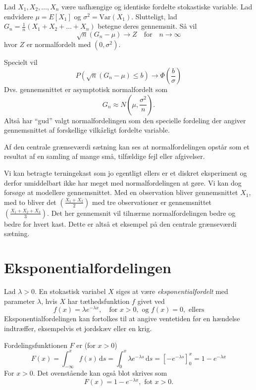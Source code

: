 \begin{sæt} 
  Lad $X_1, X_2, \ldots, X_n$ være uafhængige og identiske fordelte stokastiske variable. Lad endvidere $\mu = E[X_1]$ og $\sigma^2 = \mathrm{Var}(X_1)$. Slutteligt, lad $G_n = \frac{1}{n}(X_1 + X_2 + \ldots + X_n)$ betegne deres gennemsnit. Så vil
  \[ 
  \sqrt{n}(G_n - \mu) \to Z \quad \text{for} \quad n \to \infty
  \]
  hvor $Z$ er normalfordelt med $(0, \sigma^2)$.

  Specielt vil
  \[ 
  P \left( \sqrt{n} \left( G_n - \mu\right) \leq b \right) \to \Phi\left(\frac{b}{\sigma}\right)
  \]
  Dvs. gennemsnittet er asymptotisk normalfordelt som
  \[ 
  G_n \approx N\left(\mu, \frac{\sigma^2}{n} \right)
  .\]
  \bigbreak
  Altså har ``gud'' valgt normalfordelingen som den specielle fordeling der angiver gennemsnittet af forskellige vilkårligt fordelte variable.
\end{sæt}

 Af den centrale grænseværdi sætning kan ses at normalfordelingen opstår som et resultat af en samling af mange små, tilfældige fejl eller afgivelser. 

Vi kan betragte terningekast som jo egentligt ellers er et diskret eksperiment og derfor umiddelbart ikke har meget med normalfordelingen at gøre. Vi kan dog forsøge at modellere gennemsnittet. Med en observation bliver gennemsnittet $X_1$, med to bliver det $\left( \frac{X_1 + X_2}{2} \right)$ med tre observationer er gennemsnittet $\left( \frac{X_1 + X_2 + X_3}{3} \right)$. Det her gennemsnit vil tilnærme normalfordelingen bedre og bedre for hvert kast. Dette er altså et eksempel på den centrale grænseværdi sætning.


\section{Eksponentialfordelingen}
\begin{definition} [Eksponentialfordelingen]
  Lad $\lambda > 0$. En stokastisk variabel $X$ siges at være \textit{eksponentialfordelt} med parameter $\lambda$, hvis $X$ har tæthedsfunktion $f$ givet ved
  \[ 
  f(x) = \lambda e^{-\lambda x}, \quad \text{for } x>0, \text{ og } f(x) = 0, \text{ ellers}
  \]
  Eksponentialfordelingen kan fortolkes til at angive ventetiden før en hændelse indtræffer, eksempelvis et jordskæv eller en krig.
\end{definition}

\begin{sæt} 
  Fordelingsfunktionen $F$ er (for $x>0$)
  \[ 
  F(x) = \int_{-\infty}^{x} f(s) \, \mathrm{d}s = \int_{0}^{x} \lambda e^{-\lambda s} \, \mathrm{d}s = \left[ -e^{-\lambda s} \right]_0^{x} = 1 - e^{-\lambda x}
  \]
  For $x > 0$. Det ovenstående kan også blot skrives som
  \[ 
  F(x) = 1 - e^{-\lambda x}, \text{ fot } x>0
  .\]
\end{sæt}

